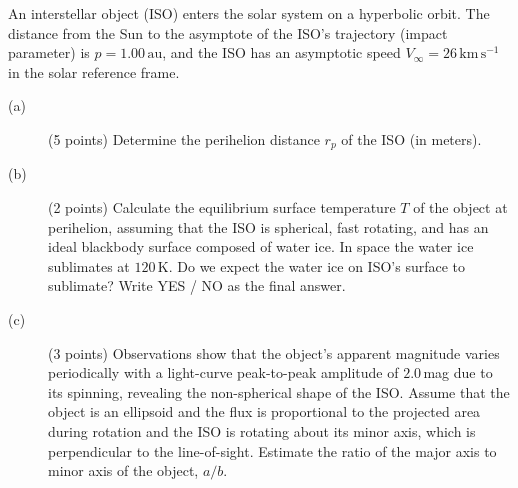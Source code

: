 An interstellar object (ISO) enters the solar system on a hyperbolic orbit.
The distance from the Sun to the asymptote of the ISO's trajectory (impact
parameter) is $p = 1.00\,\mathrm{au}$, and the ISO has an asymptotic speed
$V_\infty = 26\,\mathrm{km\,s^{-1}}$ in the solar reference frame.

\begin{description}
\item[(a)] (5 points) Determine the perihelion distance $r_p$ of the ISO (in
  meters).
\item[(b)] (2 points) Calculate the equilibrium surface temperature $T$ of
  the object at perihelion, assuming that the ISO is spherical, fast rotating,
  and has an ideal blackbody surface composed of water ice. In space the water
  ice sublimates at $120\,\mathrm{K}$. Do we expect the water ice on ISO's
  surface to sublimate? Write YES / NO as the final answer.
\item[(c)] (3 points) Observations show that the object's apparent magnitude
  varies periodically with a light-curve peak-to-peak amplitude of
  $2.0$\,mag due to its spinning, revealing the non-spherical shape of the
  ISO. Assume that the object is an ellipsoid and the flux is proportional to
  the projected area during rotation and the ISO is rotating about its minor
  axis, which is perpendicular to the line-of-sight. Estimate the ratio of the
  major axis to minor axis of the object, $a/b$.
\end{description}

